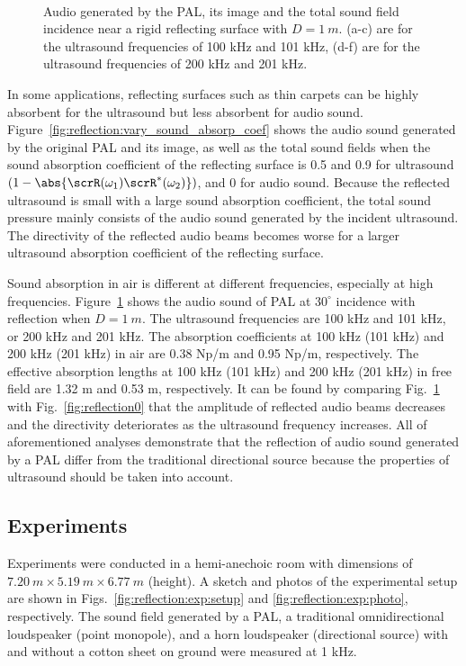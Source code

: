 \begin{figure}[!htb]
\begin{subfigure}{0.32\textwidth}
    \end{subfigure}
    \\
    \caption{Audio  generated by the PAL, its image and the total sound field  incidence near a rigid reflecting surface with $D = \SI{1 }{m}$. (a-c) are for the ultrasound frequencies of 100 kHz and 101 kHz, (d-f) are for the ultrasound frequencies of 200 kHz and 201 kHz.}
    \label{fig:reflection:ultrasound_freq}
\end{figure}
In some applications, reflecting surfaces such as thin carpets can be highly absorbent for the ultrasound but less absorbent for audio sound. 
Figure~\ref{fig:reflection:vary_sound_absorp_coef} shows the audio sound generated by the original PAL and its image, 
as well as the total sound fields when the sound absorption coefficient of the reflecting surface is 0.5 and 0.9 for ultrasound $(1 - \abs{\scrR(\omega_1)\scrR^*(\omega_2)})$, 
and 0 for audio sound. Because the reflected ultrasound is small with a large sound absorption coefficient, the total sound pressure mainly consists of the audio sound generated by the incident ultrasound. The directivity of the reflected audio beams becomes worse for a larger ultrasound absorption coefficient of the reflecting surface.

Sound absorption in air is different at different frequencies, especially at high frequencies. 
Figure~\ref{fig:reflection:ultrasound_freq} shows the audio sound of PAL at $30^\circ$ incidence with reflection when $D =\SI{1}{ m}$. 
The ultrasound frequencies are 100 kHz and 101 kHz, or 200 kHz and 201 kHz. 
The absorption coefficients at 100 kHz (101 kHz) and 200 kHz (201 kHz) in air are 0.38 Np/m and 0.95 Np/m, respectively. 
The effective absorption lengths at 100 kHz (101 kHz) and 200 kHz (201 kHz) in free field are 1.32 m and 0.53 m, respectively. 
It can be found by comparing Fig.~\ref{fig:reflection:ultrasound_freq} with Fig.~\ref{fig:reflection0} that the amplitude of reflected audio beams decreases and the directivity deteriorates as the ultrasound frequency increases. 
All of aforementioned analyses demonstrate that the reflection of audio sound generated by a PAL differ from the traditional directional source because the properties of ultrasound should be taken into account.


\subsection{Experiments}
Experiments were conducted in a hemi-anechoic room with dimensions of $\SI{7.20}{m} \times\SI{ 5.19}{ m} \times\SI{ 6.77 }{m}$ (height). 
A sketch and photos of the experimental setup are shown in Figs.~\ref{fig:reflection:exp:setup} and \ref{fig:reflection:exp:photo}, respectively. The sound field generated by a PAL, a traditional omnidirectional loudspeaker (point monopole), and a horn loudspeaker (directional source) with and without a cotton sheet on ground were measured at 1 kHz. 

